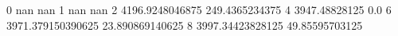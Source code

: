 0 nan nan
1 nan nan
2 4196.9248046875 249.4365234375
4 3947.48828125 0.0
6 3971.379150390625 23.890869140625
8 3997.34423828125 49.85595703125
